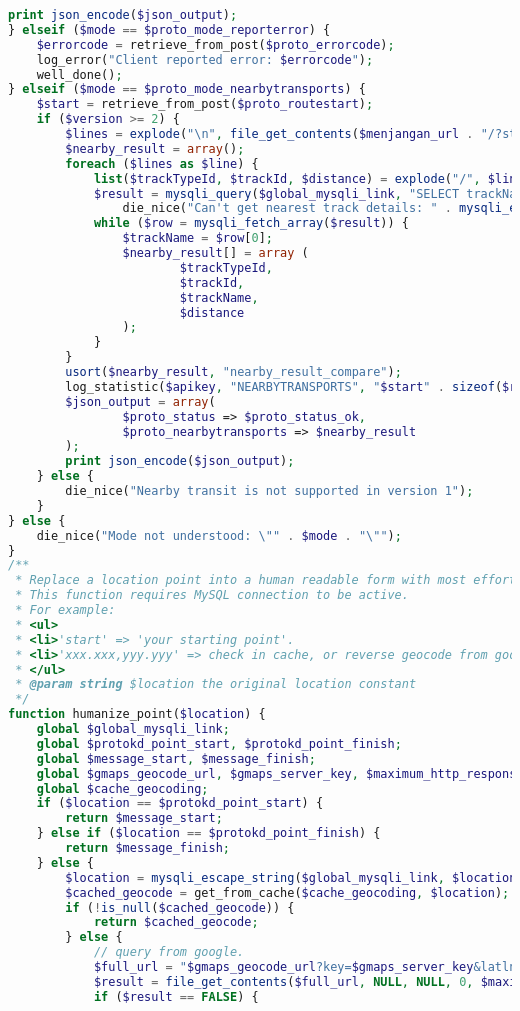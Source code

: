\begin{lstlisting}[language=PHP,basicstyle=\tiny,caption=handle.php,label={lst:handle.php}]
	print json_encode($json_output);
} elseif ($mode == $proto_mode_reporterror) {
	$errorcode = retrieve_from_post($proto_errorcode);
	log_error("Client reported error: $errorcode");
	well_done();
} elseif ($mode == $proto_mode_nearbytransports) {
	$start = retrieve_from_post($proto_routestart);
	if ($version >= 2) {
		$lines = explode("\n", file_get_contents($menjangan_url . "/?start=$start", NULL, NULL, 0, $maximum_http_response_size + 1));
		$nearby_result = array();
		foreach ($lines as $line) {
			list($trackTypeId, $trackId, $distance) = explode("/", $line);
			$result = mysqli_query($global_mysqli_link, "SELECT trackName FROM tracks WHERE trackId='$trackId' AND trackTypeId='$trackTypeId'") or
				die_nice("Can't get nearest track details: " . mysqli_error($global_mysqli_link));
			while ($row = mysqli_fetch_array($result)) {
				$trackName = $row[0];
				$nearby_result[] = array (
						$trackTypeId,
						$trackId,
						$trackName,
						$distance 
				);
			}
		}
		usort($nearby_result, "nearby_result_compare");
		log_statistic($apikey, "NEARBYTRANSPORTS", "$start" . sizeof($results));		
		$json_output = array(
				$proto_status => $proto_status_ok,
				$proto_nearbytransports => $nearby_result
		);
		print json_encode($json_output);
	} else {
		die_nice("Nearby transit is not supported in version 1");
	}
} else {
	die_nice("Mode not understood: \"" . $mode . "\"");
}
/**
 * Replace a location point into a human readable form with most effort.
 * This function requires MySQL connection to be active.
 * For example:
 * <ul>
 * <li>'start' => 'your starting point'.
 * <li>'xxx.xxx,yyy.yyy' => check in cache, or reverse geocode from google if miss
 * </ul>
 * @param string $location the original location constant
 */
function humanize_point($location) {
	global $global_mysqli_link;
	global $protokd_point_start, $protokd_point_finish;
	global $message_start, $message_finish;
	global $gmaps_geocode_url, $gmaps_server_key, $maximum_http_response_size;
	global $cache_geocoding;
	if ($location == $protokd_point_start) {
		return $message_start;
	} else if ($location == $protokd_point_finish) {
		return $message_finish;
	} else {
		$location = mysqli_escape_string($global_mysqli_link, $location);
		$cached_geocode = get_from_cache($cache_geocoding, $location);
		if (!is_null($cached_geocode)) {
			return $cached_geocode;
		} else {
			// query from google.
			$full_url = "$gmaps_geocode_url?key=$gmaps_server_key&latlng=$location&sensor=false";
			$result = file_get_contents($full_url, NULL, NULL, 0, $maximum_http_response_size + 1);
			if ($result == FALSE) {

\end{lstlisting}
